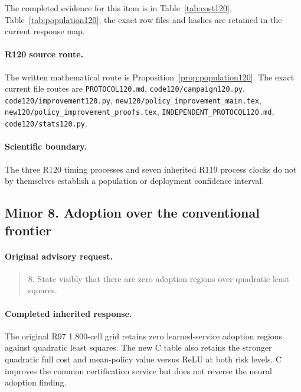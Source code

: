 The completed evidence for this item is in Table~\ref{tab:cost120}, Table~\ref{tab:population120}; the exact row files and hashes are retained in the current response map.
\paragraph{R120 source route.}
The written mathematical route is Proposition~\ref{prop:population120}. The exact current file routes are \nolinkurl{PROTOCOL120.md}, \nolinkurl{code120/campaign120.py}, \nolinkurl{code120/improvement120.py}, \nolinkurl{new120/policy_improvement_main.tex}, \nolinkurl{new120/policy_improvement_proofs.tex}, \nolinkurl{INDEPENDENT_PROTOCOL120.md}, \nolinkurl{code120/stats120.py}.
\paragraph{Scientific boundary.}
The three R120 timing processes and seven inherited R119 process clocks do not by themselves establish a population or deployment confidence interval.

\subsection{Minor 8. Adoption over the conventional frontier}
\label{response120:minor-8}
\paragraph{Original advisory request.}
\begin{quote}
8. State visibly that there are zero adoption regions over quadratic least squares.
\end{quote}
\paragraph{Completed inherited response.}
The original R97 1,800-cell grid retains zero learned-service adoption regions against quadratic least squares. The new C table also retains the stronger quadratic full cost and mean-policy value versus ReLU at both risk levels. C improves the common certification service but does not reverse the neural adoption finding.
